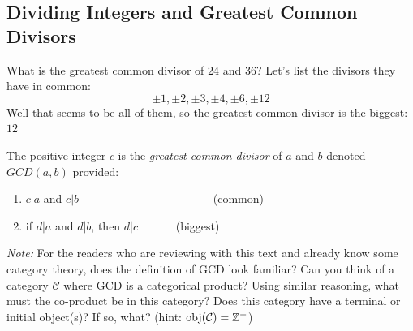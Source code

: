 
\subsection{Dividing Integers and Greatest Common Divisors}
What is the greatest common divisor of $24$ and $36$? Let's list the divisors they have in common:
\begin{equation}
    \pm 1, \pm 2, \pm 3, \pm 4, \pm 6, \pm 12 \nonumber
\end{equation}
Well that seems to be all of them, so the greatest common divisor is the biggest: $12$\steezybreak\\
\begin{definition}
The positive integer $c$ is the \textit{greatest common divisor} of $a$ and $b$ denoted $GCD(a,b)$ provided:
\begin{enumerate}[label=\roman*)]
    \item $c|a$ and $c|b$      \ \ \ \ \ \ \ \ \ \ \ \ \ \ \ \ \ \ \ \ \ \ \ (common)
    \item if $d|a$ and $d|b$, then $d|c$ \ \ \ \ \ \  (biggest)
\end{enumerate}
\end{definition}
\textit{Note:} For the readers who are reviewing with this text and already know some category theory, does the definition of GCD look familiar? Can you think of a category $\mathcal{C}$ where GCD is a categorical product? Using similar reasoning, what must the co-product be in this category? Does this category have a terminal or initial object(s)? If so, what? (hint: $\text{obj}(\mathcal{C})={\mathbb{ Z}}^+$)
